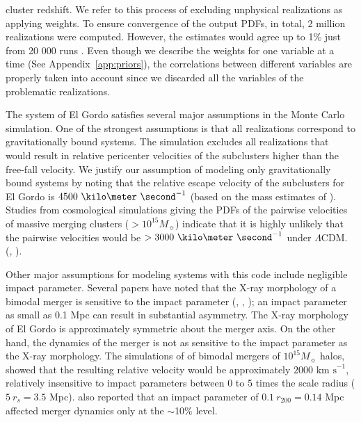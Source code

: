\documentclass[letterpaper,useAMS,usenatbib]{mn2e}
\begin{document}
cluster redshift.  We refer to this process of excluding unphysical
realizations as applying weights. 
To ensure convergence of the output PDFs, in total, 2 million realizations
were computed. However, the estimates would agree up to 1\% just 
from 20 000 runs . 
Even though we describe the weights for one variable at a time 
(See Appendix~\ref{app:priors}), 
the correlations between different variables are properly taken into account
since we discarded all the variables of the problematic
realizations.\par 
The system of El Gordo satisfies several major assumptions in the Monte Carlo
simulation. One of the strongest assumptions is that all realizations correspond to
gravitationally bound systems. The simulation excludes all realizations
that would result in relative pericenter velocities of the subclusters
higher than the free-fall velocity. We justify our assumption of
modeling only gravitationally bound systems by noting that the relative escape
velocity of the subclusters for El Gordo is
$4500~\kilo\meter~\second^{-1}$ (based on the mass estimates of
\cite{Jee13}). 
Studies from cosmological simulations giving the PDFs of the pairwise velocities of massive merging clusters ($>
10^{15} M_{\sun}$) indicate that it is highly unlikely that the pairwise
velocities would be $> 3000~\kilo \meter~\second^{-1}$ under $\Lambda$CDM.
(\citealt{Thompson12}, \citealt{Lee2010}). \par
Other major assumptions for
modeling systems with this code include negligible impact parameter.
Several papers have noted that the X-ray morphology of a bimodal merger is
sensitive to the impact parameter (\citealt{Springel2007},
\citealt{Ricker98}, \citealt{Mastropietro2008a}); an impact
parameter as small as 0.1 Mpc can result in substantial asymmetry. 
The X-ray morphology of El Gordo is approximately symmetric about the merger axis. 
On the other hand, the dynamics of the merger is not as sensitive to the
impact parameter as the X-ray morphology. The simulations of
\cite{Ricker98} of bimodal mergers of $10^{15} M_{\sun}$ halos, showed that the resulting relative
velocity would be approximately $2000 \text{ km s}^{-1}$, relatively
insensitive to impact parameters between 0 to 5 times the scale radius ($5~r_s = 3.5$ Mpc). \cite{Mastropietro2008a} also reported that
an impact parameter of $0.1~r_{200} = 0.14$ Mpc affected merger dynamics only at the $\sim$10\% level.   
\end{document}
